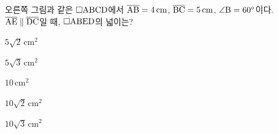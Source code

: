 \noindent\begin{minipage}[t]{0.58\linewidth}\vspace{0pt}\raggedright 오른쪽 그림과 같은 $\square\mathrm{ABCD}$에서 $\overline{\mathrm{AB}}=4\,\mathrm{cm}$, $\overline{\mathrm{BC}}=5\,\mathrm{cm}$, $\angle\mathrm{B}=60^\circ$이다. $\overline{\mathrm{AE}}\parallel\overline{\mathrm{DC}}$일 때, $\square\mathrm{ABED}$의 넓이는?\end{minipage}\hfill\begin{minipage}[t]{0.4\linewidth}\vspace{0pt}\centering \resizebox{\ifdim\width>\linewidth\linewidth\else\width\fi}{!}{}\end{minipage}\par
\begin{choices32}{\rule[-3ex]{0pt}{8ex}$5\sqrt{2}\,\mathrm{cm}^2$}{\rule[-3ex]{0pt}{8ex}$5\sqrt{3}\,\mathrm{cm}^2$}{\rule[-3ex]{0pt}{8ex}$10\,\mathrm{cm}^2$}{\rule[-3ex]{0pt}{8ex}$10\sqrt{2}\,\mathrm{cm}^2$}{\rule[-3ex]{0pt}{8ex}$10\sqrt{3}\,\mathrm{cm}^2$}\end{choices32}

